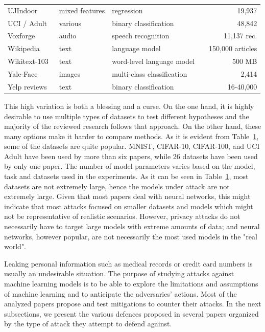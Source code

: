 \begin{table}[!t]
\begin{tabular}{p{3cm} p{2cm} p{3.2cm} p{2.5cm} r}
UJIndoor~ & mixed features & regression &  & 19,937 \\
UCI / Adult~ & various & binary classification &  & 48,842 \\
Voxforge~ & audio & speech recognition &  & 11,137 rec. \\
Wikipedia~ & text & language model &  & 150,000 articles \\
Wikitext-103~ & text & word-level language model &  & 500 MB \\ 
Yale-Face~ & images & multi-class classification &  & 2,414 \\
Yelp reviews~ & text & binary classification &  & 16-40,000 \\
\bottomrule
\end{tabular}
\label{table:datasets_summary1}
\end{table}
This high variation is both a blessing and a curse. On the one hand, it is highly desirable to use multiple types of datasets to test different hypotheses and the majority of the reviewed research follows that approach. On the other hand, these many options make it harder to compare methods. As it is evident from Table~\ref{table:datasets_summary1}, some of the datasets are quite popular. MNIST, CIFAR-10, CIFAR-100, and UCI Adult have been used by more than six papers, while 26 datasets have been used by only one paper.
The number of model parameters varies based on the model, task and datasets used in the experiments. As it can be seen in Table~\ref{table:datasets_summary1}, most datasets are not extremely large, hence the models under attack are not extremely large. Given that most papers deal with neural networks, this might indicate that most attacks focused on smaller datasets and models which might not be representative of realistic scenarios. However, privacy attacks do not necessarily have to target large models with extreme amounts of data; and neural networks, however popular, are not necessarily the most used models in the "real world".

\label{sec:defenses}
Leaking personal information such as medical records or credit card numbers is usually an undesirable situation. The purpose of studying attacks against machine learning models is to be able to explore the limitations and assumptions of machine learning and to anticipate the adversaries' actions. Most of the analyzed papers propose and test mitigations to counter their attacks. In the next subsections, we present the various defences proposed in several papers organized by the type of attack they attempt to defend against.

